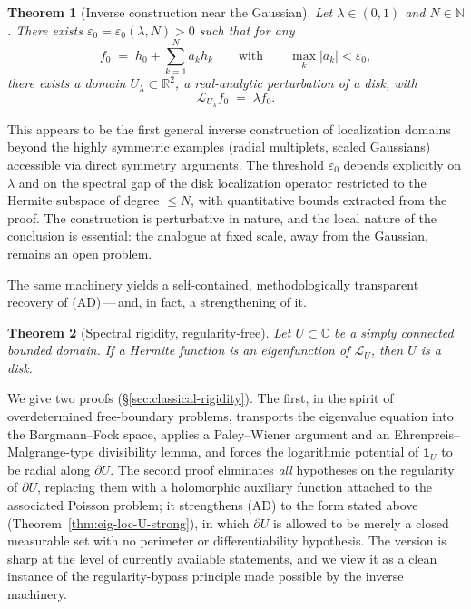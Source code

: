 \documentclass[a4paper,11pt,reqno]{amsart}
\numberwithin{equation}{section}
\theoremstyle{plain} %
\newtheorem{theorem}{Theorem}
\theoremstyle{definition} %
\theoremstyle{remark}
\newcommand{\R}{\mathbb{R}}
\newcommand{\C}{\mathbb{C}}
\newcommand{\N}{\mathbb{N}}
\begin{document}
\begin{theorem}[Inverse construction near the Gaussian]\label{thm:perturb}
Let $\lambda\in (0,1)$ and $N\in\N$. There exists $\varepsilon_0=\varepsilon_0(\lambda,N)>0$ such that for any
\[
f_0 \;=\; h_0+\sum_{k=1}^N a_k h_k
\qquad\text{with}\qquad
\max_k|a_k|<\varepsilon_0,
\]
there exists a domain $U_\lambda\subset\R^2$, a real-analytic perturbation of a disk, with
\[
\mathcal L_{U_\lambda} f_0 \;=\; \lambda f_0 .
\]
\end{theorem}

This appears to be the first general inverse construction of localization domains beyond the highly symmetric examples (radial multiplets, scaled Gaussians) accessible via direct symmetry arguments. The threshold $\varepsilon_0$ depends explicitly on $\lambda$ and on the spectral gap of the disk localization operator restricted to the Hermite subspace of degree $\le N$, with quantitative bounds extracted from the proof. The construction is perturbative in nature, and the local nature of the conclusion is essential: the analogue at fixed scale, away from the Gaussian, remains an open problem.

The same machinery yields a self-contained, methodologically transparent recovery of (AD)\,---\,and, in fact, a strengthening of it.

\begin{theorem}[Spectral rigidity, regularity-free]\label{thm:eig-loc-U}
Let $U\subset\C$ be a simply connected bounded domain. If a Hermite function is an eigenfunction of $\mathcal L_U$, then $U$ is a disk.
\end{theorem}

We give two proofs (\S\ref{sec:classical-rigidity}). The first, in the spirit of overdetermined free-boundary problems, transports the eigenvalue equation into the Bargmann--Fock space, applies a Paley--Wiener argument and an Ehrenpreis--Malgrange-type divisibility lemma, and forces the logarithmic potential of $\mathbf 1_U$ to be radial along $\partial U$. The second proof eliminates \emph{all} hypotheses on the regularity of $\partial U$, replacing them with a holomorphic auxiliary function attached to the associated Poisson problem; it strengthens (AD) to the form stated above (Theorem~\ref{thm:eig-loc-U-strong}), in which $\partial U$ is allowed to be merely a closed measurable set with no perimeter or differentiability hypothesis. The version is sharp at the level of currently available statements, and we view it as a clean instance of the regularity-bypass principle made possible by the inverse machinery.
\end{document}
